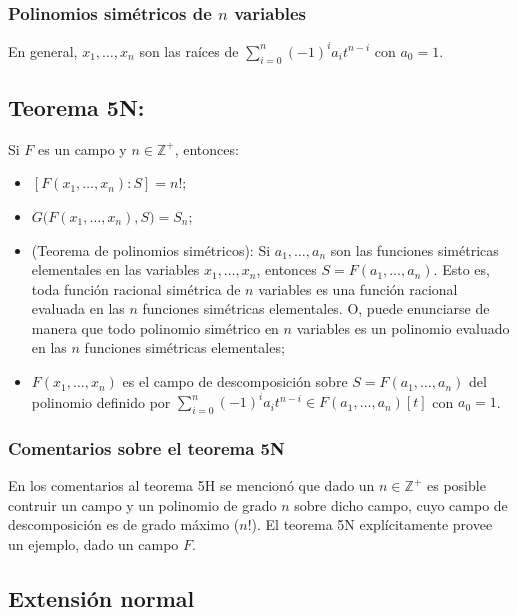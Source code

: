 \documentclass{article}
\begin{document}
\subsubsection*{\color{purple} Polinomios simétricos de $n$ variables}

En general, $x_1,\ldots,x_n$ son las raíces de $\displaystyle\sum_{i=0}^n (-1)^ia_it^{n-i}$ con $a_0=1$.

\subsection*{\color{red} Teorema 5N:}

Si $F$ es un campo y $n\in\mathbb{Z}^+$, entonces:
\begin{itemize}
\item $[F(x_1,\ldots,x_n):S]=n!$;

\item $G\big(F(x_1,\ldots,x_n), S\big)=S_n$;

\item (Teorema de polinomios simétricos): Si $a_1,\ldots,a_n$ son las funciones simétricas elementales en las variables $x_1,\ldots,x_n$, entonces $S=F(a_1,\ldots,a_n)$. Esto es, toda función racional simétrica de $n$ variables es una función racional evaluada en las $n$ funciones simétricas elementales. O, puede enunciarse de manera que todo polinomio simétrico en $n$ variables es un polinomio evaluado en las $n$ funciones simétricas elementales;

\item $F(x_1,\ldots,x_n)$ es el campo de descomposición sobre $S=F(a_1,\ldots,a_n)$ del polinomio definido por $\displaystyle\sum_{i=0}^n (-1)^ia_it^{n-i}\in F(a_1,\ldots,a_n)[t]$ con $a_0=1$.
\end{itemize}

\subsubsection*{\color{teal} Comentarios sobre el teorema 5N}

En los comentarios al teorema 5H se mencionó que dado un $n\in\mathbb{Z}^+$ es posible contruir un campo y un polinomio de grado $n$ sobre dicho campo, cuyo campo de descomposición es de grado máximo ($n!$). El teorema 5N explícitamente provee un ejemplo, dado un campo $F$.

\subsection*{\color{violet} Extensión normal}
\end{document}
